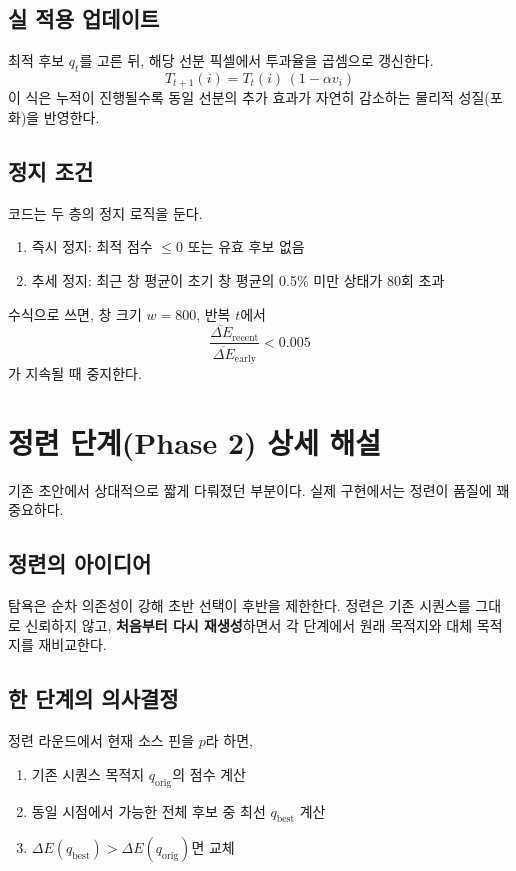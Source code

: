\documentclass[11pt,a4paper]{article}
\begin{document}
\subsection{실 적용 업데이트}
최적 후보 \(q_t\)를 고른 뒤,
해당 선분 픽셀에서 투과율을 곱셈으로 갱신한다.
\begin{equation}
T_{t+1}(i)=T_t(i)\,(1-\alpha v_i)
\end{equation}
이 식은 누적이 진행될수록 동일 선분의 추가 효과가 자연히 감소하는
물리적 성질(포화)을 반영한다.

\subsection{정지 조건}
코드는 두 층의 정지 로직을 둔다.
\begin{enumerate}
  \item 즉시 정지: 최적 점수 \(\le 0\) 또는 유효 후보 없음
  \item 추세 정지: 최근 창 평균이 초기 창 평균의 0.5\% 미만 상태가 80회 초과
\end{enumerate}
수식으로 쓰면, 창 크기 \(w=800\), 반복 \(t\)에서
\begin{equation}
\frac{\overline{\Delta E}_{\mathrm{recent}}}{\overline{\Delta E}_{\mathrm{early}}}<0.005
\end{equation}
가 지속될 때 중지한다.

\section{정련 단계(Phase 2) 상세 해설}
기존 초안에서 상대적으로 짧게 다뤄졌던 부분이다.
실제 구현에서는 정련이 품질에 꽤 중요하다.

\subsection{정련의 아이디어}
탐욕은 순차 의존성이 강해 초반 선택이 후반을 제한한다.
정련은 기존 시퀀스를 그대로 신뢰하지 않고,
\textbf{처음부터 다시 재생성}하면서 각 단계에서 원래 목적지와 대체 목적지를 재비교한다.

\subsection{한 단계의 의사결정}
정련 라운드에서 현재 소스 핀을 \(p\)라 하면,
\begin{enumerate}
  \item 기존 시퀀스 목적지 \(q_{\mathrm{orig}}\)의 점수 계산
  \item 동일 시점에서 가능한 전체 후보 중 최선 \(q_{\mathrm{best}}\) 계산
  \item \(\Delta E(q_{\mathrm{best}})>\Delta E(q_{\mathrm{orig}})\)면 교체
\end{enumerate}
\end{document}
